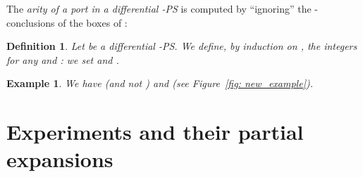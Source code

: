 \documentclass{article}
\theoremstyle{plain}
\newtheorem{definition}{Definition}
\newtheorem{example}{Example}
\newcommand{\wiresatzero}[1]{\mathcal{W}_0(#1)}
\newcommand{\conclusionscirc}[1]{\mathcal{P}_\circ^{\textsf{f}}(#1)}
\newcommand{\conclusionsnotcirc}[1]{\mathcal{P}_\bullet^{\textsf{f}}(#1)}
\begin{document}
\begin{comment}
\begin{definition}
Let  be a PS of depth . Let  be a ground-structure such that 
\begin{itemize}
\item 
\item 
\item 
\end{itemize}
Let  be a surjection . Then we define a differential -PS  of depth  as follows:
\begin{itemize}
\item 
\item 
 \item 
\item q \in \wiresatzero{R}q \in \conclusionsnotcirc{R}
\item 
\item 
\item 
\item b_R(o)(q) \notin \conclusionscirc{R}b_R(o)(q) \in \conclusionscirc{R}
\end{itemize}
\end{definition}
\end{comment}




The \emph{arity  of a port  in a differential -PS } is computed  by ``ignoring'' the -conclusions of the boxes of :

\begin{definition}
Let  be a differential -PS. We define, by induction on , the integers  for any  and : we set 
       and 
  .
\end{definition}

\begin{example}
We have  (and not ) and  (see Figure~\ref{fig: new_example}).
\end{example}

\begin{comment}
\begin{definition}
Let  be a differential -PS. We define, by induction on , : .
\end{definition}

\begin{example}
We have , where  is the PS of Figure~\ref{fig: new_example}.
\end{example}
\end{comment}

\section{Experiments and their partial expansions}\label{section: Experiments}
\end{document}
